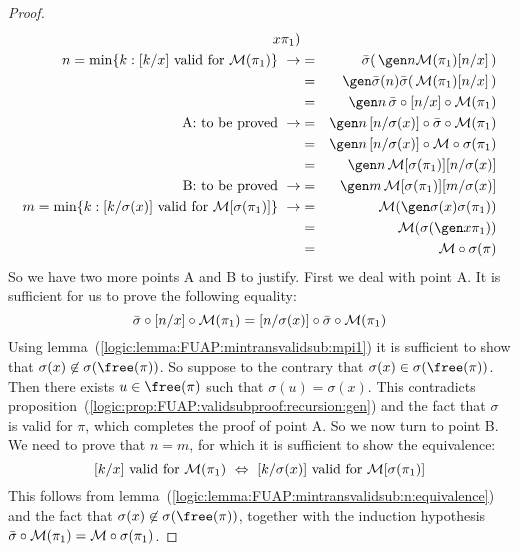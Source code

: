 \begin{proof}
\begin{eqnarray*}
    x\pi_{1})\\
    \mbox{$n=\min\{k:[k/x]\mbox{ valid for }{\cal M}(\pi_{1})\}$}\
    \rightarrow
    &=&\bar{\sigma}(\,\gen n{\cal M}(\pi_{1})[n/x]\,)\\
    &=&\gen \bar{\sigma}(n)\bar{\sigma}(\,{\cal
    M}(\pi_{1})[n/x]\,)\\
    &=&\gen n\,\bar{\sigma}\circ [n/x]\circ{\cal
    M}(\pi_{1})\\
    \mbox{A: to be proved}\ \rightarrow
    &=&\gen n\,[n/\sigma(x)]\circ\bar{\sigma}\circ{\cal M}(\pi_{1})\\
    &=&\gen n\,[n/\sigma(x)]\circ{\cal M}\circ\sigma(\pi_{1})\\
    &=&\gen n\,{\cal M}[\sigma(\pi_{1})][n/\sigma(x)]\\
    \mbox{B: to be proved}\ \rightarrow
    &=&\gen m\,{\cal M}[\sigma(\pi_{1})][m/\sigma(x)]\\
    \mbox{$m=\min\{k:[k/\sigma(x)]\mbox{ valid for }{\cal M}[\sigma(\pi_{1})]\}$}\
    \rightarrow
    &=&{\cal M}(\gen\sigma(x)\sigma(\pi_{1}))\\
    &=&{\cal M}(\sigma(\gen x\pi_{1}))\\
    &=&{\cal M}\circ\sigma(\pi)
    \end{eqnarray*}
So we have two more points A and B to justify. First we deal with
point A. It is sufficient for us to prove the following equality:
    \[
    \bar{\sigma}\circ [n/x]\circ{\cal
    M}(\pi_{1})= [n/\sigma(x)]\circ\bar{\sigma}\circ{\cal M}(\pi_{1})
    \]
Using lemma~(\ref{logic:lemma:FUAP:mintransvalidsub:mpi1}) it is
sufficient to show that $\sigma(x)\not\in\sigma(\free(\pi))$. So
suppose to the contrary that $\sigma(x)\in\sigma(\free(\pi))$. Then
there exists $u\in\free(\pi)$ such that $\sigma(u)=\sigma(x)$. This
contradicts
proposition~(\ref{logic:prop:FUAP:validsubproof:recursion:gen}) and
the fact that $\sigma$ is valid for $\pi$, which completes the proof
of point A. So we now turn to point B. We need to prove that $n=m$,
for which it is sufficient to show the equivalence:
    \[
    \mbox{$[k/x]$ valid for ${\cal M}(\pi_{1})$}\ \Leftrightarrow
    \ \mbox{$[k/\sigma(x)]$ valid for ${\cal M}[\sigma(\pi_{1})]$}
    \]
This follows from
lemma~(\ref{logic:lemma:FUAP:mintransvalidsub:n:equivalence}) and
the fact that  $\sigma(x)\not\in\sigma(\free(\pi))$, together with
the induction hypothesis $\bar{\sigma}\circ{\cal M}(\pi_{1})={\cal
M}\circ\sigma(\pi_{1})$.
\end{proof}
